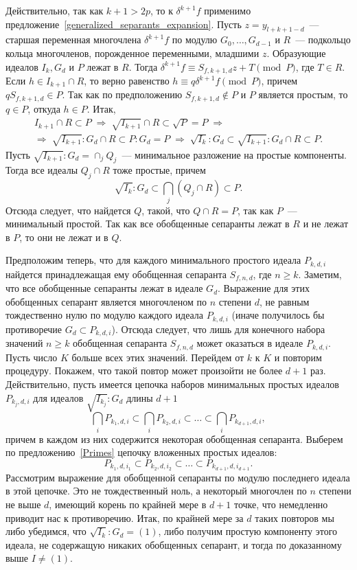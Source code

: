 \documentclass[11pt]{article}
\renewcommand{\ge}{\geqslant}
\theoremstyle{plain}
\theoremstyle{definition}
\theoremstyle{remark}
\begin{document}
Действительно, так как $k+1 > 2p$, то к $\delta^{k+1} f$ применимо предложение~\ref{generalized_separants_expansion}. 
Пусть $z = y_{l+k+1-d}$~--- старшая переменная многочлена $\delta^{k+1} f$ по модулю $G_0, \ldots, G_{d-1}$
и $R$~--- подкольцо кольца многочленов, порожденное переменными, младшими $z$. 
Образующие идеалов $I_k, G_d$ и $P$ лежат в $R$.
Тогда $\delta^{k+1} f \equiv S_{f,k+1,d} z + T \pmod P$, где $T \in R$.
Если $h \in I_{k+1} \cap R$, то верно равенство
$h \equiv q \delta^{k+1} f \pmod P$, причем $q S_{f,k+1,d} \in P$.
Так как по предположению $S_{f,k+1,d} \notin P$ и $P$ является простым, то $q \in P$,
откуда $h \in P$. Итак,
\begin{gather*}
 I_{k+1} \cap R \subset P \; \Longrightarrow \; \sqrt{I_{k+1}} \cap R \subset \sqrt{P} = P \; \Longrightarrow \\
 \Longrightarrow \; \sqrt{I_{k+1}}:G_d \cap R \subset P:G_d = P \; \Longrightarrow \; \sqrt{I_k}:G_d \subset \sqrt{I_{k+1}}:G_d \cap R \subset P.
\end{gather*}
Пусть $\sqrt{I_{k+1}}:G_d = \cap_j Q_j$~--- минимальное разложение на простые компоненты.
Тогда все идеалы $Q_j \cap R$ тоже простые, причем
$$
 \sqrt{I_k}:G_d \subset \bigcap_j \left( Q_j \cap R \right) \subset P.
$$
Отсюда следует, что найдется $Q$, такой, что $Q \cap R = P$, так как $P$~--- минимальный простой.
Так как все обобщенные сепаранты лежат в $R$ и не лежат в $P$, то они не лежат и в $Q$.

\bigskip

Предположим теперь, что для каждого минимального простого идеала $P_{k,d,i}$
найдется принадлежащая ему обобщенная сепаранта $S_{f,n,d}$, где $n \ge k$.
Заметим, что все обобщенные сепаранты лежат в идеале $G_d$.
Выражение для этих обобщенных сепарант является многочленом по $n$ степени $d$,
не равным тождественно нулю по модулю каждого идеала $P_{k,d,i}$ (иначе получилось бы противоречие $G_d \subset P_{k,d,i}$).
Отсюда следует, что лишь для конечного набора значений $n \ge k$ обобщенная сепаранта $S_{f,n,d}$ может оказаться в идеале $P_{k,d,i}$.
Пусть число $K$ больше всех этих значений. Перейдем от $k$ к $K$ и повторим процедуру. Покажем, что такой повтор может произойти не более $d+1$ раз. Действительно, пусть имеется цепочка наборов минимальных простых идеалов $P_{k_j, d, i}$ для идеалов $\sqrt{I_{k_j}}:G_d$ длины $d+1$
$$
 \bigcap_i P_{k_1, d, i} \subset \bigcap_i P_{k_2, d, i} \subset \ldots \subset \bigcap_i P_{k_{d+1}, d, i},
$$
причем в каждом из них содержится некоторая обобщенная сепаранта.
Выберем по предложению~\ref{Primes} цепочку вложенных простых идеалов:
$$
 P_{k_1, d, i_1} \subset P_{k_2, d, i_2} \subset \ldots \subset P_{k_{d+1}, d, i_{d+1}}.
$$
Рассмотрим выражение для обобщенной сепаранты по модулю последнего идеала в этой цепочке. Это не тождественный ноль,
а некоторый многочлен по $n$ степени не выше $d$, имеющий корень по крайней мере в $d+1$ точке, что немедленно приводит нас к противоречию.
Итак, по крайней мере за $d$ таких повторов мы либо убедимся, что $\sqrt{I_k}:G_d = (1)$, либо получим простую компоненту этого идеала, не содержащую никаких обобщенных сепарант, и тогда по доказанному выше $I \ne (1)$.
\end{document}
